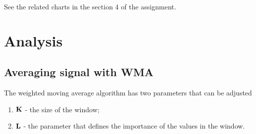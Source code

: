 \documentclass[a4paper,12pt,fleqn]{article}
\begin{document}
        See the related charts in the section 4 of the assignment.
        \newpage
        \section{Analysis}

        \subsection{Averaging signal with WMA}

        \hspace{1em} The weighted moving average algorithm has two parameters that can be adjusted

        \begin{enumerate}
                \item \begin{math} \bold{K}\end{math} - the size of the window;
                \item \begin{math}
                    \bold{L}
                \end{math} - the parameter that defines the importance of the values in the window.

                \end{enumerate}
\end{document}
